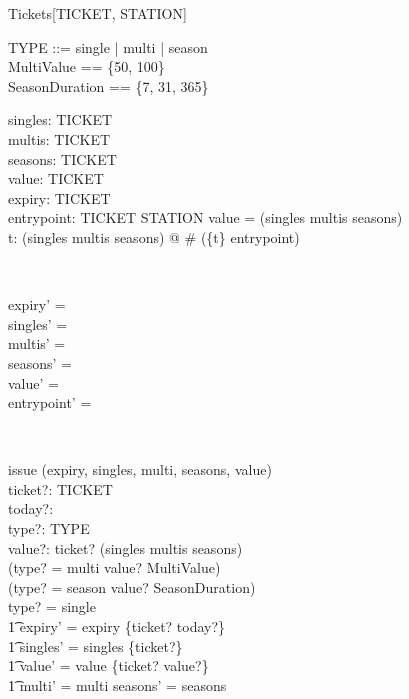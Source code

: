 \begin{class}{Tickets}[TICKET, STATION]
\also
\begin{zed}
TYPE ::= single | multi | season \\
MultiValue == \{50, 100\} \\ 
SeasonDuration == \{7, 31, 365\}
\end{zed}
\begin{state}
singles:  \power TICKET \\ 
multis:  \power TICKET \\ 
seasons:  \power TICKET \\ 
value: TICKET \pfun  \nat  \\ 
expiry: TICKET \pfun  \nat  \\ 
entrypoint: TICKET \pfun STATION 
\where
 \dom value = (singles \cup multis \cup seasons) \\ 
\forall t: (singles \cup multis \cup seasons) @ \# (\{t\} \dres
entrypoint) \end{state} \\ 
\begin{init}
expiry' = \emptyset \\ 
singles' = \emptyset \\ 
multis' = \emptyset \\ 
seasons' = \emptyset \\ 
value' = \emptyset \\ 
entrypoint' = \emptyset
\end{init} \\ 
\begin{schema}{issue}
\Delta (expiry, singles, multi, seasons, value)\\
ticket?: TICKET \\ 
today?:  \nat  \\ 
type?: TYPE \\ 
value?:  \nat  
\where
 ticket? \notin (singles \cup multis \cup seasons) \land\\
       (type? = multi \implies value? \in MultiValue) \land\\
       (type? = season \implies value? \in SeasonDuration)\\
type? = single \implies \\
\t1 expiry' = expiry \cup \{ticket? \mapsto today?\} \land \\ 
\t1 singles' = singles \cup \{ticket?\} \land \\ 
\t1 value' = value \cup \{ticket? \mapsto value?\} \land\\ 
\t1 multi' = multi \land seasons' = seasons\\

\end{schema}
\end{class}

